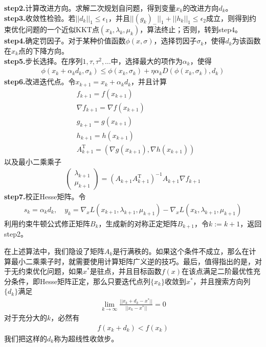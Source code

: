             \textbf{step2.}计算改进方向。求解二次规划自问题，得到变量$x_k$的改进方向$d_k$。\\
            \textbf{step3.}收敛性检验。若$||d_k||_1 \leqslant \epsilon_1$，并且$||(g_k)_-||_1+||h_k||_1 \leqslant \epsilon_2$成立，则得到约束优化问题的一个近似KKT点$(x_k,\lambda_k,\mu_k)$，算法终止；否则，转到step4。\\
            \textbf{step4.}确定罚因子。对于某种价值函数$\phi(x,\sigma)$，选择罚因子$\sigma_k$，使得$d_k$为该函数在$x_k$点的下降方向。\\
            \textbf{step5.}步长选择。在序列$1,\tau,\tau^2,\dots$中，选择最大的项作为$\alpha_k$，使得
            \begin{align*}
            \phi(x_k+\alpha_k d_k,\sigma_k) \leqslant \phi(x_k,\sigma_k)+\eta \alpha_k D (\phi(x_k,\sigma_k),d_k)
            \end{align*}
            \textbf{step6.}改进迭代点。令$x_{k+1} = x_{k}+\alpha_k d_k$，并且计算
            \begin{align*}
            & f_{k+1} = f(x_{k+1})\\
            & \nabla f_{k+1} = \nabla f(x_{k+1})\\
            & g_{k+1} = g(x_{k+1})\\
            & h_{k+1} = h(x_{k+1})\\
            & A_{k+1}^{\mathrm{T}} = (\nabla g(x_{k+1}),\nabla h(x_{k+1}))
            \end{align*}
            以及最小二乘乘子
            \begin{align*}
            \begin{pmatrix}
            \lambda_{k+1}\\
            \mu_{k+1}
            \end{pmatrix}
            =
            (A_{k+1}A_{k+1}^\mathrm{T})^{-1}A_{k+1}\nabla f_{k+1}
            \end{align*}
            \textbf{step7.}校正Hesse矩阵。令
            \begin{align*}
            s_k = \alpha_k d_k,\quad y_k = \nabla_x L(x_{k+1},\lambda_{k+1},\mu_{k+1}) - \nabla_x L(x_k,\lambda_{k+1},\mu_{k+1})
            \end{align*}
            利用约束牛顿公式修正矩阵$B_k$，生成新的对称正定矩阵$B_{k+1}$，令$k:=k+1$，返回step2。
            \par
            在上述算法中，我们隐设了矩阵$A_k$是行满秩的。如果这个条件不成立，那么在计算最小二乘乘子时，就需要使用计算矩阵广义逆的技巧。最后，值得指出的是，对于无约束优化问题，如果$x^*$是驻点，并且目标函数$f(x)$在该点满足二阶最优性充分条件，即Hesse矩阵正定，那么只要迭代点列$\{x_k\}$收敛到$x^*$，并且搜索方向列$\{d_k\}$满足
            \begin{align*}
            \lim _{k\to \infty} \frac{||x_k+d_k-x^*||}{||x_k-x^*||} = 0
            \end{align*}
            对于充分大的$k$，必然有
            \begin{align*}
            f(x_k+d_k) < f(x_k)
            \end{align*}
            我们把这样的$d_k$称为超线性收敛步。
